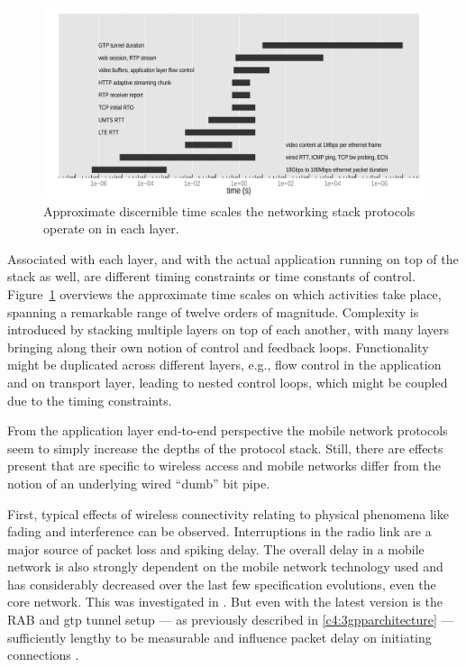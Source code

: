 \begin{figure}[htb]
	\centering
	\includegraphics[width=1.0\textwidth]{images/layer-timescales.pdf}
	\caption{Approximate discernible time scales the networking stack protocols operate on in each layer.}
\label{c5:fig:timescales}
\end{figure}

Associated with each layer, and with the actual application running on top of the stack as well, are different timing constraints or time constants of control. Figure~\ref{c5:fig:timescales} overviews the approximate time scales on which activities take place, spanning a remarkable range of twelve orders of magnitude. Complexity is introduced by stacking multiple layers on top of each another, with many layers bringing along their own notion of control and feedback loops. Functionality might be duplicated across different layers, e.g., flow control in the application and on transport layer, leading to nested control loops, which might be coupled due to the timing constraints.

From the application layer end-to-end perspective the mobile network protocols seem to simply increase the depths of the protocol stack. Still, there are effects present that are specific to wireless access and mobile networks differ from the notion of an underlying wired ``dumb'' bit pipe.

First, typical effects of wireless connectivity relating to physical phenomena like fading and interference can be observed. Interruptions in the radio link are a major source of packet loss and spiking delay.
The overall delay in a mobile network is also strongly dependent on the mobile network technology used and has considerably decreased over the last few specification evolutions, even the core network. This was investigated in  \cite{laner2011dissecting3gdelay}. But even with the latest version is the \gls{RAB} and \gls{gtp} tunnel setup --- as previously described in \ref{c4:3gpparchitecture} --- sufficiently lengthy to be measurable and influence packet delay on initiating connections \cite{arlos2010packetsizedelayinfluence}.

